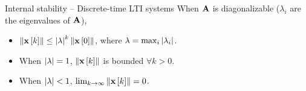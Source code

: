 \documentclass[aspectratio=169]{beamer}
\def\mf{\ensuremath\mathbf}
\def\lp{\ensuremath\left(}
\def\rp{\ensuremath\right)}
\def\lv{\ensuremath\left\lvert}
\def\rv{\ensuremath\right\rvert}
\def\lV{\ensuremath\left\lVert}
\def\rV{\ensuremath\right\rVert}
\def\ls{\ensuremath\left[}
\def\rs{\ensuremath\right]}
\def\bmx{\ensuremath\begin{bmatrix*}[r]}
\def\emx{\ensuremath\end{bmatrix*}}
\newcommand{\ct}[1]{\lp #1\rp}
\newcommand{\dt}[1]{\ls #1\rs}
\begin{document}










\begin{frame}[t]{Internal stability -- Discrete-time LTI systems}
When $\mf{A}$ is diagonalizable ($\lambda_i$ are the eigenvalues of $\mf{A}$),
\begin{itemize}
    \item $\lV \mf{x}\dt{k} \rV \leq  \lv \lambda \rv^k \lV \mf{x}\dt{0} \rV$, where $\lambda = \max_i \lv \lambda_i \rv$.
    \item When $\lv \lambda \rv = 1$, $\lV \mf{x}\dt{k}\rV$ is bounded $\forall k > 0$.
    \item When $\lv \lambda \rv < 1$, $\lim_{k \to \infty} \lV \mf{x}\dt{k}\rV = 0$.
\end{itemize}
\end{frame}
\end{document}
